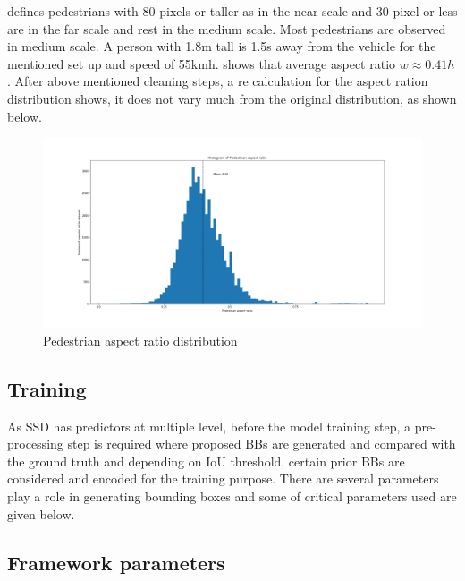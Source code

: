 \cite{dollar2009pedestrian} defines pedestrians with 80 pixels or taller as in the near scale and 30 pixel or less
are in the far scale and rest in the medium scale. Most pedestrians are observed in medium scale. A person with 1.8m tall is 1.5s away from the vehicle for the mentioned set up and speed of 55km\/h. \cite{dollar2011pedestrian} shows that average aspect ratio \textit{$w \approx 0.41h$}. After above mentioned cleaning steps, a re calculation for the aspect ration distribution shows, it does not vary much from the original distribution, as shown below.

\begin{figure}[H]
\includegraphics[scale=0.4]{aspect_ratio_distribution}
\begin{center}
\caption{Pedestrian aspect ratio distribution}
\end{center}
\end{figure}

\subsection{Training }
As SSD has predictors at multiple level, before the model training step, a pre-processing step is required where proposed BBs are generated and compared with the ground truth and depending on IoU threshold, certain prior BBs are considered and encoded for the training purpose. There are several parameters play a role in generating bounding boxes and some of critical parameters used are given below.

\subsection{Framework parameters}

